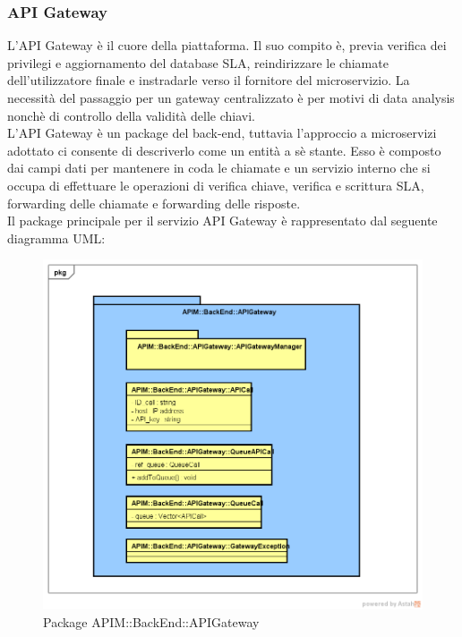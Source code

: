 \subsubsection{API Gateway}

L'API Gateway è il cuore della piattaforma. Il suo compito è, previa verifica dei privilegi e aggiornamento del database SLA, reindirizzare le chiamate dell'utilizzatore finale e instradarle verso il fornitore del microservizio.  La necessità del passaggio per un gateway centralizzato è per motivi di data analysis nonchè di controllo della validità delle chiavi. \\

L'API Gateway è un package del back-end, tuttavia l'approccio a microservizi adottato ci consente di descriverlo come un entità a sè stante. Esso è composto dai campi dati per mantenere in coda le chiamate e un servizio interno che si occupa di effettuare le operazioni di verifica chiave, verifica e scrittura SLA, forwarding delle chiamate e forwarding delle risposte.  \\

Il package principale per il servizio API Gateway è rappresentato dal seguente diagramma UML:


\begin{figure}[!htbp]
	\centering
	\includegraphics[scale=0.45]{UML/DiagrammiPackage/APIGateway.png}
	\caption{Package APIM::BackEnd::APIGateway}
\end{figure}


